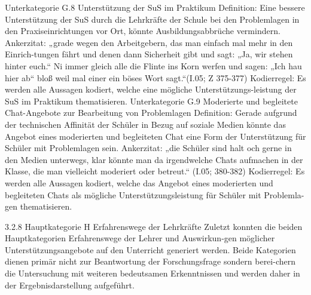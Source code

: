 Unterkategorie G.8 Unterstützung der SuS im Praktikum
Definition: Eine bessere Unterstützung der SuS durch die Lehrkräfte der Schule bei den Problemlagen in den Praxiseinrichtungen vor Ort, könnte Ausbildungsabbrüche vermindern.
Ankerzitat: „grade wegen den Arbeitgebern, das man einfach mal mehr in den Einrich-tungen fährt und denen dann Sicherheit gibt und sagt: „Ja, wir stehen hinter euch.“ Ni immer gleich alle die Flinte ins Korn werfen und sagen: „Ich hau hier ab“ bloß weil mal einer ein böses Wort sagt.“(I.05; Z 375-377)
Kodierregel: Es werden alle Aussagen kodiert, welche eine mögliche Unterstützungs-leistung der SuS im Praktikum thematisieren.
Unterkategorie G.9 Moderierte und begleitete Chat-Angebote zur Bearbeitung von Problemlagen
Definition: Gerade aufgrund der technischen Affinität der Schüler in Bezug auf soziale Medien könnte das Angebot eines moderierten und begleiteten Chat eine Form der Unterstützung für Schüler mit Problemlagen sein.
Ankerzitat: „die Schüler sind halt och gerne in den Medien unterwegs, klar könnte man da irgendwelche Chats aufmachen in der Klasse, die man vielleicht moderiert oder betreut.“ (I.05; 380-382)
Kodierregel: Es werden alle Aussagen kodiert, welche das Angebot eines moderierten und begleiteten Chats als mögliche Unterstützungsleistung für Schüler mit Problemla-gen thematisieren.

3.2.8 Hauptkategorie H Erfahrenswege der Lehrkräfte
Zuletzt konnten die beiden Hauptkategorien Erfahrenswege der Lehrer und Auswirkun-gen möglicher Unterstützungsangebote auf den Unterricht generiert werden. Beide Kategorien dienen primär nicht zur Beantwortung der Forschungsfrage sondern berei-chern die Untersuchung mit weiteren bedeutsamen Erkenntnissen und werden daher in der Ergebnisdarstellung aufgeführt. 


